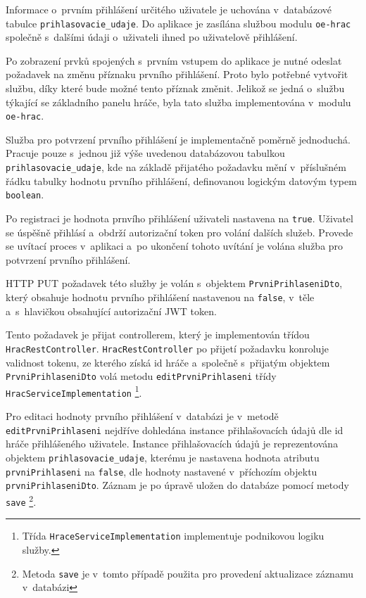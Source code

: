 \documentclass[twoside, 12pt]{article}
\begin{document}
{Informace o~prvním přihlášení určitého uživatele je uchována v~databázové tabulce \texttt{prihlasovacie\_udaje}.
Do aplikace je zasílána službou modulu \texttt{oe-hrac} společně s~dalšími údaji o~uživateli ihned po uživatelově přihlášení.

Po zobrazení prvků spojených s~prvním vstupem do aplikace je nutné odeslat požadavek na změnu příznaku prvního přihlášení.
Proto bylo potřebné vytvořit službu, díky které bude možné tento příznak změnit.
Jelikož se jedná o~službu týkající se základního panelu hráče, byla tato služba implementována v~modulu \texttt{oe-hrac}.

Služba pro potvrzení prvního přihlášení je implementačně poměrně jednoduchá.
Pracuje pouze s~jednou již výše uvedenou databázovou tabulkou \texttt{prihlasovacie\_udaje},
kde na základě přijatého požadavku mění v~příslušném řádku tabulky hodnotu prvního přihlášení,
definovanou logickým datovým typem \texttt{boolean}.

Po registraci je hodnota prnvího přihlášení uživateli nastavena na \texttt{true}.
Uživatel se úspěšně přihlásí a~obdrží autorizační token pro volání dalších služeb.
Provede se uvítací proces v~aplikaci a~po ukončení tohoto uvítání
je volána služba pro potvrzení prvního přihlášení.

HTTP PUT požadavek této služby je volán s~objektem \texttt{PrvniPrihlaseniDto},
který obsahuje hodnotu prvního přihlášení nastavenou na \texttt{false}, v~těle
a~s~hlavičkou obsahující autorizační JWT token.

Tento požadavek je přijat controllerem, který je implementován třídou \texttt{HracRestController}.
\texttt{HracRestController} po přijetí požadavku konroluje validnost tokenu, ze kterého získá id hráče
a~společně s~přijatým objektem \texttt{PrvniPrihlaseniDto} volá metodu \texttt{editPrvniPrihlaseni}
třídy \texttt{HracServiceImplementation}
\footnote{Třída \texttt{HraceServiceImplementation} implementuje podnikovou logiku služby.}.

Pro editaci hodnoty prvního přihlášení v~databázi je v~metodě \texttt{editPrvniPrihlaseni} nejdříve dohledána
instance přihlašovacích údajů dle id hráče přihlášeného uživatele.
Instance přihlašovacích údajů je reprezentována objektem \texttt{prihlasovacie\_udaje},
kterému je nastavena hodnota atributu \texttt{prvniPrihlaseni} na \texttt{false},
dle hodnoty nastavené v~příchozím objektu \texttt{prvniPrihlaseniDto}.
Záznam je po úpravě uložen do databáze pomocí metody \texttt{save}
\footnote{Metoda \texttt{save} je v~tomto případě použita pro provedení aktualizace záznamu v~databázi}.

}
\end{document}
